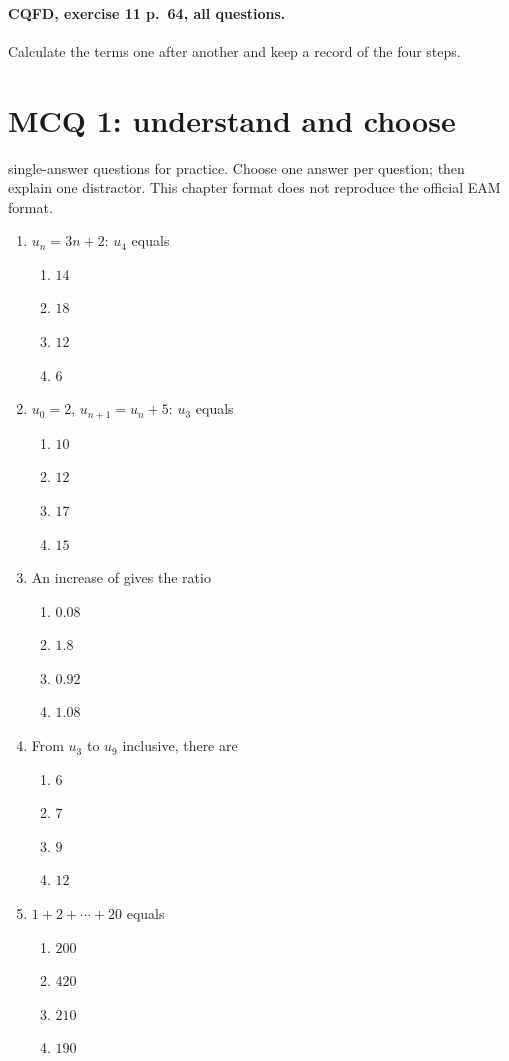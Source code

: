 \paragraph{CQFD, exercise 11 p.~64, all questions.}\label{C01-M2} Calculate the terms one after another and keep a record of the four steps.
\begingroup\small
\mxnewpage\section*{MCQ 1: understand and choose}\label{C01-Q1}
 single-answer questions for practice. Choose one answer per question; then explain one distractor. This chapter format does not reproduce the official EAM format.
\begin{enumerate}
\item $u_n=3n+2$: $u_4$ equals
\begin{enumerate}[label=\Alph*.,itemsep=2pt]
\item $14$
\item $18$
\item $12$
\item $6$
\end{enumerate}
\item $u_0=2$, $u_{n+1}=u_n+5$: $u_3$ equals
\begin{enumerate}[label=\Alph*.,itemsep=2pt]
\item $10$
\item $12$
\item $17$
\item $15$
\end{enumerate}
\item An increase of  gives the ratio
\begin{enumerate}[label=\Alph*.,itemsep=2pt]
\item $\num{0,08}$
\item $\num{1,8}$
\item $\num{0,92}$
\item $\num{1,08}$
\end{enumerate}
\item From $u_3$ to $u_9$ inclusive, there are
\begin{enumerate}[label=\Alph*.,itemsep=2pt]
\item $6$
\item $7$
\item $9$
\item $12$
\end{enumerate}
\item $1+2+\cdots+20$ equals
\begin{enumerate}[label=\Alph*.,itemsep=2pt]
\item $200$
\item $420$
\item $210$
\item $190$
\end{enumerate}
\end{enumerate}
